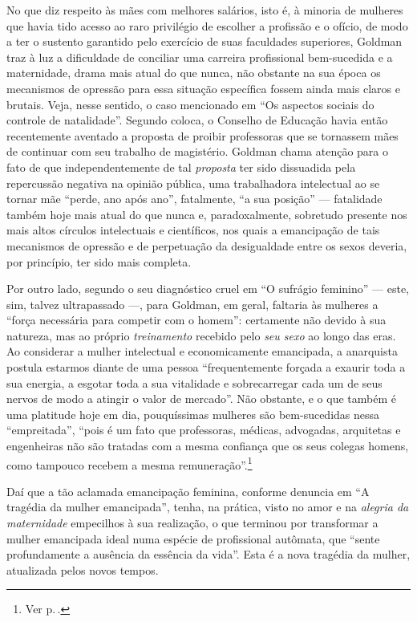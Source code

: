 No que diz respeito às mães com melhores salários, isto é, à minoria de
mulheres que havia tido acesso ao raro privilégio de escolher a
profissão e o ofício, de modo a ter o sustento garantido pelo exercício
de suas faculdades superiores, Goldman traz à luz a dificuldade de
conciliar uma carreira profissional bem-sucedida e a maternidade, drama
mais atual do que nunca, não obstante na sua época os mecanismos de
opressão para essa situação específica fossem ainda mais claros e
brutais. Veja, nesse sentido, o caso mencionado em ``Os aspectos
sociais do controle de natalidade''. Segundo coloca, o Conselho de
Educação havia então recentemente aventado a proposta de proibir
professoras que se tornassem mães de continuar com seu trabalho de
magistério. Goldman chama atenção para o fato de que independentemente
de tal \textit{proposta} ter sido dissuadida pela repercussão negativa na
opinião pública, uma trabalhadora intelectual ao se tornar mãe ``perde,
ano após ano'', fatalmente, ``a sua posição'' --- fatalidade também hoje
mais atual do que nunca e, paradoxalmente, sobretudo presente nos mais
altos círculos intelectuais e científicos, nos quais a emancipação de
tais mecanismos de opressão e de perpetuação da desigualdade entre os
sexos deveria, por princípio, ter sido mais completa.

Por outro lado, segundo o seu diagnóstico cruel em ``O sufrágio
feminino'' --- este, sim, talvez ultrapassado ---, para Goldman, em geral,
faltaria às mulheres a ``força necessária para competir com o homem'':
certamente não devido à sua natureza, mas ao próprio \textit{treinamento}
recebido pelo \textit{seu sexo} ao longo das eras. Ao considerar a mulher
intelectual e economicamente emancipada, a anarquista postula estarmos
diante de uma pessoa ``frequentemente forçada a exaurir toda a sua
energia, a esgotar toda a sua vitalidade e sobrecarregar cada um de seus
nervos de modo a atingir o valor de mercado''. Não obstante, e o que
também é uma platitude hoje em dia, pouquíssimas mulheres são
bem-sucedidas nessa ``empreitada'', ``pois é um fato que
professoras, médicas, advogadas, arquitetas e engenheiras não são
tratadas com a mesma confiança que os seus colegas homens, como tampouco
recebem a mesma remuneração''.\footnote{Ver p.\,\pageref{igualdade}.}

Daí que a tão aclamada emancipação
feminina, conforme denuncia em ``A tragédia da mulher emancipada'',
tenha, na prática, visto no amor e na \textit{alegria da maternidade}
empecilhos à sua realização, o que terminou por transformar a mulher
emancipada ideal numa espécie de profissional autômata, que ``sente
profundamente a ausência da essência da vida''. Esta é a nova tragédia
da mulher, atualizada pelos novos tempos. 

